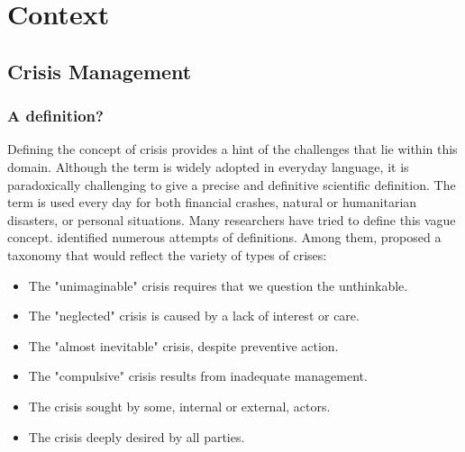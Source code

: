 \chapter{Context}

\section{Crisis Management}
\subsection{A definition?}
Defining the concept of crisis provides a hint of the challenges that lie within this domain.
Although the term is widely adopted in everyday language, it is paradoxically challenging to give a precise and definitive scientific definition.
The term is used every day for both financial crashes, natural or humanitarian disasters, or personal situations.
Many researchers have tried to define this vague concept.
\textcite{lagadecGESTIONCRISES1994} identified numerous attempts of definitions.
Among them, \textcite{rosenthalCrisisDecisionMakingNetherlands1986} proposed a taxonomy that would reflect the variety of types of crises:

\begin{itemize}
    \item The "unimaginable" crisis requires that we question the unthinkable.
    \item The "neglected" crisis is caused by a lack of interest or care.
    \item The "almost inevitable" crisis, despite preventive action.
    \item The "compulsive" crisis results from inadequate management.
    \item The crisis sought by some, internal or external, actors.
    \item The crisis deeply desired by all parties.
\end{itemize}

